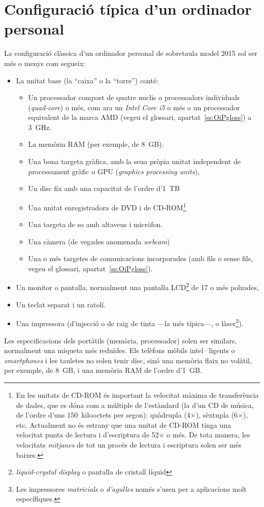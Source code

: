 \section{Configuració típica d'un ordinador personal}
La configuració clàssica d'un ordinador personal de sobretaula model
2015 sol ser més o menys com segueix:
\begin{itemize}
\item La unitat base (la ``caixa'' o la ``torre'') conté:
  \begin{itemize}
  \item Un processador compost de quatre nuclis o processadors
    individuals (\emph{quad-core}) o més, com ara un \emph{Intel Core
      i5} o més o un processador equivalent de la marca AMD (vegeu el
    glossari, apartat~\ref{ss:OiPgloss}) a 3~GHz.
  \item La memòria RAM (per exemple, de 8~GB).
  \item Una bona targeta gràfica, amb la seua pròpia unitat independent
    de processament gràfic o GPU (\emph{graphics processing units}),
  \item Un disc fix amb una capacitat de l'ordre d'1~TB
  \item Una unitat enregistradora de DVD i de CD-ROM\footnote{En les
      unitats de CD-ROM és important la velocitat màxima de
      transferència de dades, que es dóna com a múltiple de l'estàndard
      (la d'un CD de música, de l'ordre d'uns 150~kilooctets per segon):
      quàdrupla (4$\times$), sèxtupla (6$\times$), etc.  Actualment no
      és estrany que una unitat de CD-ROM tinga una velocitat punta de
      lectura i d'escriptura de 52$\times$ o més.  De tota manera, les
      velocitats \emph{mitjanes} de tot un procés de lectura i
      escriptura solen ser més baixes.}
  \item Una targeta de so amb altaveus i micròfon.
  \item Una càmera (de vegades anomenada \emph{webcam})
  \item Una o més targetes de comunicacions incorporades (amb fils o
    sense fils, vegeu el glossari, apartat~\ref{ss:OiPgloss}).
  \end{itemize}
\item Un monitor o pantalla, normalment una pantalla
  LCD\footnote{\emph{liquid-crystal display} o pantalla de cristall
    líquid} de 17 o més polzades,
\item Un teclat separat i un ratolí.
\item Una impressora (d'injecció o de raig de tinta ---la més
  típica---, o làser\footnote{Les impressores \emph{matricials} o \emph{d'agulles} només s'usen per a aplicacions molt específiques.}).
\end{itemize}
Les especificacions dels portàtils (memòria, processador) solen ser
similars, normalment una miqueta més reduïdes. Els telèfons mòbils
intel·ligents o \emph{smartphones} i les tauletes no solen tenir disc,
sinó una memòria flaix no volàtil, per exemple, de 8~GB, i una memòria
RAM de l'ordre d'1~GB.

